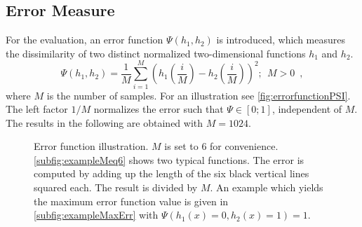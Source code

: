 \subsection{Error Measure}
\label{subsec:syntheticDataErrorMeasurement}

For the evaluation, an error function $\Psi(h_1, h_2)$ is introduced, which measures the dissimilarity of two distinct normalized two-dimensional functions $h_1$ and $h_2$.
\begin{equation}
	\Psi(h_1, h_2) = \frac{1}{M} \sum\limits_{i=1}^M \left( h_1\left(\frac{i}{M}\right) - h_2\left(\frac{i}{M}\right) \right)^2; \ \ M > 0 \enspace ,
	\label{eq:errfuncF1F2dissimilaritymeasure}
\end{equation}
where $M$ is the number of samples. For an illustration see \autoref{fig:errorfunctionPSI}. The left factor $1/M$ normalizes the error such that $\Psi \in \left[0;1\right]$, independent of $M$. The results in the following are obtained with $M = 1024$.
\begin{figure}[bt]
  \centering
  \caption[Error function illustration]{Error function illustration. $M$ is set to 6 for convenience. \autoref{subfig:exampleMeq6} shows two typical functions. The error is computed by adding up the length of the six black vertical lines squared each. The result is divided by $M$. An example which yields the maximum error function value is given in \autoref{subfig:exampleMaxErr} with $\Psi(h_1(x) = 0, h_2(x) = 1) = 1$.}
  \label{fig:errorfunctionPSI}
\end{figure}


